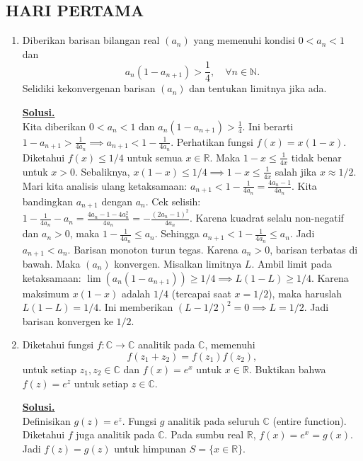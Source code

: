 \documentclass[12pt,twoside]{article}
\newenvironment{solution}
{
	\par\noindent\textbf{\underline{Solusi.}}\\
}
{
	\par
}
\begin{document}
\subsection{HARI PERTAMA}
\begin{enumerate}
  \item Diberikan barisan bilangan real $(a_n)$ yang memenuhi kondisi $0<a_n<1$ dan $$
          a_n(1-a_{n+1})>\frac{1}{4}, \quad \forall n\in\mathbb{N}.$$
        Selidiki kekonvergenan barisan $(a_n)$ dan tentukan limitnya jika ada.
        \begin{solution}
          Kita diberikan $0 < a_n < 1$ dan $a_n(1-a_{n+1}) > \frac{1}{4}$.
          Ini berarti $1-a_{n+1} > \frac{1}{4a_n} \implies a_{n+1} < 1 - \frac{1}{4a_n}$.
          Perhatikan fungsi $f(x) = x(1-x)$. Diketahui $f(x) \le 1/4$ untuk semua $x \in \mathbb{R}$.
          Maka $1-x \le \frac{1}{4x}$ tidak benar untuk $x>0$.
          Sebaliknya, $x(1-x) \le 1/4 \implies 1-x \le \frac{1}{4x}$ salah jika $x \approx 1/2$.
          Mari kita analisis ulang ketaksamaan:
          $a_{n+1} < 1 - \frac{1}{4a_n} = \frac{4a_n - 1}{4a_n}$.
          Kita bandingkan $a_{n+1}$ dengan $a_n$.
          Cek selisih: $1 - \frac{1}{4a_n} - a_n = \frac{4a_n - 1 - 4a_n^2}{4a_n} = -\frac{(2a_n-1)^2}{4a_n}$.
          Karena kuadrat selalu non-negatif dan $a_n > 0$, maka $1 - \frac{1}{4a_n} \le a_n$.
          Sehingga $a_{n+1} < 1 - \frac{1}{4a_n} \le a_n$.
          Jadi $a_{n+1} < a_n$. Barisan monoton turun tegas.
          Karena $a_n > 0$, barisan terbatas di bawah. Maka $(a_n)$ konvergen. Misalkan limitnya $L$.
          Ambil limit pada ketaksamaan:
          $\lim (a_n(1-a_{n+1})) \ge 1/4 \implies L(1-L) \ge 1/4$.
          Karena maksimum $x(1-x)$ adalah $1/4$ (tercapai saat $x=1/2$), maka haruslah $L(1-L) = 1/4$.
          Ini memberikan $(L-1/2)^2 = 0 \implies L = 1/2$.
          Jadi barisan konvergen ke $1/2$.
        \end{solution}
  \item Diketahui fungsi $f:\mathbb{C}\to\mathbb{C}$ analitik pada $\mathbb{C}$, memenuhi
        $$
          f(z_1+z_2)=f(z_1)f(z_2),
        $$
        untuk setiap $z_1,z_2\in \mathbb{C}$ dan $f(x)=e^x$ untuk $x\in \mathbb{R}$. Buktikan bahwa $f(z)=e^z$ untuk setiap $z\in\mathbb{C}$.
        \begin{solution}
          Definisikan $g(z) = e^z$. Fungsi $g$ analitik pada seluruh $\mathbb{C}$ (entire function).
          Diketahui $f$ juga analitik pada $\mathbb{C}$.
          Pada sumbu real $\mathbb{R}$, $f(x) = e^x = g(x)$.
          Jadi $f(z) = g(z)$ untuk himpunan $S = \{x \in \mathbb{R}\}$.

\end{solution}
\end{enumerate}
\end{document}
